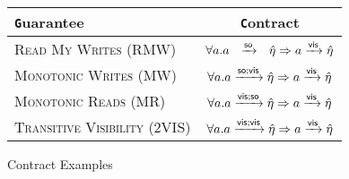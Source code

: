 \begin{figure}[h]
\centering
\begin{scriptsize}
\begin{tabular}{|l | c |}
\hline
 { \texttt Guarantee} & {\texttt Contract} \\ [0.5ex]
\hline
{\tiny \textsc{Read My Writes (RMW)}} & $\forall a. a ~  ~\xrightarrow{{\textsf{so}}}  ~ ~
\hat{\eta} \Rightarrow a \xrightarrow{{\normalfont \textsf{vis}}} \hat{\eta} $ \\
{\tiny \textsc{Monotonic Writes (MW)}} & $\forall a. a \xrightarrow{{\textsf{so}};{\normalfont \textsf{vis}}}
\hat{\eta} \Rightarrow a \xrightarrow{{\normalfont \textsf{vis}}} \hat{\eta} $ \\
{\tiny \textsc{Monotonic Reads (MR)}} & $\forall a. a \xrightarrow{{\normalfont \textsf{vis}};{\textsf{so}}}
\hat{\eta} \Rightarrow a \xrightarrow{{\normalfont \textsf{vis}}} \hat{\eta} $ \\
{\tiny \textsc{Transitive Visibility (2VIS)}} & $\forall a. a \xrightarrow{{\normalfont \textsf{vis}};{\normalfont \textsf{vis}}}
\hat{\eta} \Rightarrow a \xrightarrow{{\normalfont \textsf{vis}}} \hat{\eta} $ \\

\hline
\end{tabular}
\end{scriptsize}
\caption{Contract Examples}
\label{fig:ctrt_example}

\end{figure}
